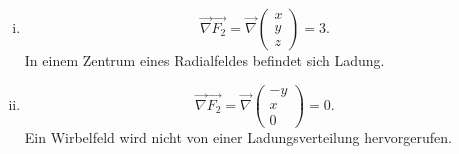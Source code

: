 \begin{enumerate}[(a)]
\begin{enumerate}[(i)]
\item
\begin{equation}
\vec{\nabla}  \vec{F_{2}} = \vec{\nabla}  \begin{pmatrix} x \\ y \\ z \end{pmatrix} = 3.
\end{equation}
In einem Zentrum eines Radialfeldes befindet sich Ladung.
\item
\begin{equation}
\vec{\nabla}  \vec{F_{2}} = \vec{\nabla}  \begin{pmatrix} -y \\ x \\ 0 \end{pmatrix} = 0.
\end{equation}
Ein Wirbelfeld wird nicht von einer Ladungsverteilung hervorgerufen.
\end{enumerate}

\end{enumerate}
